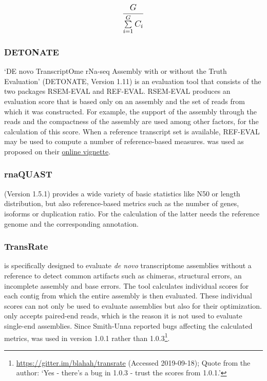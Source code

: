 \documentclass[12pt,a4paper,english]{article}
\begin{document}
	\begin{equation}
	\label{eq:inter}
	\mathlarger{\frac{G}{\sum\limits_{i=1}^{G} C_{i} }}  
	\end{equation}

\subsubsection*{DETONATE}
	`DE novo TranscriptOme rNa-seq Assembly with or without the Truth Evaluation' (DETONATE, Version 1.11) \citep{DETONATE:14} is an evaluation tool that consists of the two packages RSEM-EVAL and REF-EVAL.
	RSEM-EVAL produces an evaluation score that is based only on an assembly and the set of reads from which it was constructed.
	For example, the support of the assembly through the reads and the compactness of the assembly are used among other factors, for the calculation of this score.
	When a reference transcript set is available, REF-EVAL may be used to compute a number of reference-based measures.    \detonate was used as proposed on their \href{http://deweylab.biostat.wisc.edu/detonate/vignette.html}{online vignette}.
	
\subsubsection*{rnaQUAST}
	\rnaquast (Version 1.5.1) \citep{rnaQUAST:16} provides a wide variety of basic statistics like N50 or length distribution, but also reference-based metrics such as the number of genes, isoforms or duplication ratio. For the calculation of the latter \rnaquast needs the reference genome and the corresponding annotation.
	
\subsubsection*{TransRate}
	\transrate \citep{TransRate:16} is specifically designed to evaluate \textit{de novo} transcriptome assemblies without a reference to detect common artifacts such as chimeras, structural errors, an incomplete assembly and base errors. The tool calculates individual scores for each contig from which the entire assembly is then evaluated. These individual scores can not only be used to evaluate assemblies but also for their optimization. \transrate only accepts paired-end reads, which is the reason it is not used to evaluate single-end assemblies.
	Since Smith-Unna reported bugs affecting the calculated metrics, \transrate was used in version 1.0.1 rather than 1.0.3\footnote{\href{https://gitter.im/blahah/transrate}{https://gitter.im/blahah/transrate} (Accessed 2019-09-18); Quote from the author: `Yes - there's a bug in 1.0.3 - trust the scores from 1.0.1.'}.
	
\end{document}
